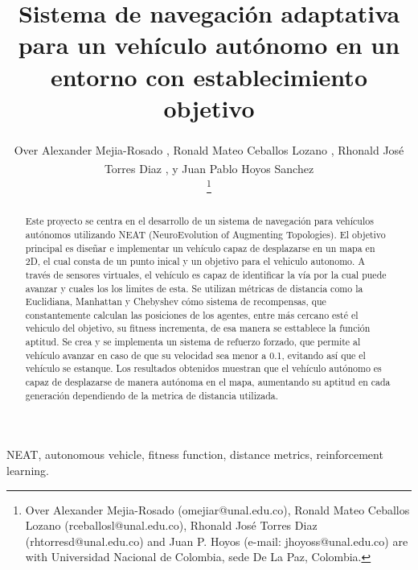 \documentclass[lettersize, journal]{IEEEtran}
\begin{document}
\title{Sistema de navegación adaptativa para un vehículo autónomo en un entorno con establecimiento objetivo}


\author{Over Alexander Mejia-Rosado \textsuperscript{\href{https://orcid.org/0009-0008-8152-2754}{\textcolor{orcidcolor}{\faOrcid}}}, 
Ronald Mateo Ceballos Lozano \textsuperscript{\href{https://orcid.org/0009-0003-6478-3286}{\textcolor{orcidcolor}{\faOrcid}}}, 
Rhonald José Torres Diaz \textsuperscript{\href{mailto:rhtorresd@unal.edu.co}{\textcolor{orcidcolor}{}}}, y 
Juan Pablo Hoyos Sanchez \textsuperscript{\href{mailto:jhoyoss@unal.edu.co}{\textcolor{orcidcolor}{}}}

\thanks{Over Alexander Mejia-Rosado (omejiar@unal.edu.co), Ronald Mateo Ceballos Lozano (rceballosl@unal.edu.co), Rhonald José Torres Diaz (rhtorresd@unal.edu.co) and Juan P. Hoyos (e-mail: jhoyoss@unal.edu.co) are with Universidad Nacional de Colombia, sede De La Paz, Colombia.}%
}

\maketitle

\begin{abstract}
Este proyecto se centra en el desarrollo de un sistema de navegación para vehículos autónomos utilizando NEAT (NeuroEvolution of Augmenting Topologies). El objetivo principal es diseñar e implementar un vehículo capaz de desplazarse en un mapa en 2D, el cual consta de un punto inical y un objetivo para el vehiculo autonomo. A través de sensores virtuales, el vehículo es capaz de identificar la vía por la cual puede avanzar y cuales los los limites de esta. Se utilizan métricas de distancia como la Euclidiana, Manhattan y Chebyshev cómo sistema de recompensas, que constantemente calculan las posiciones de los agentes, entre más cercano esté el vehiculo del objetivo, su fitness incrementa, de esa manera se esttablece la función aptitud. Se crea y se implementa un sistema de refuerzo forzado, que permite al vehículo avanzar en caso de que su velocidad sea menor a 0.1, evitando así que el vehículo se estanque. Los resultados obtenidos muestran que el vehículo autónomo es capaz de desplazarse de manera autónoma en el mapa, aumentando su aptitud en cada generación dependiendo de la metrica de distancia utilizada.
\end{abstract}

\begin{IEEEkeywords}
NEAT, autonomous vehicle, fitness function, distance metrics, reinforcement learning.
\end{IEEEkeywords}
\end{document}
